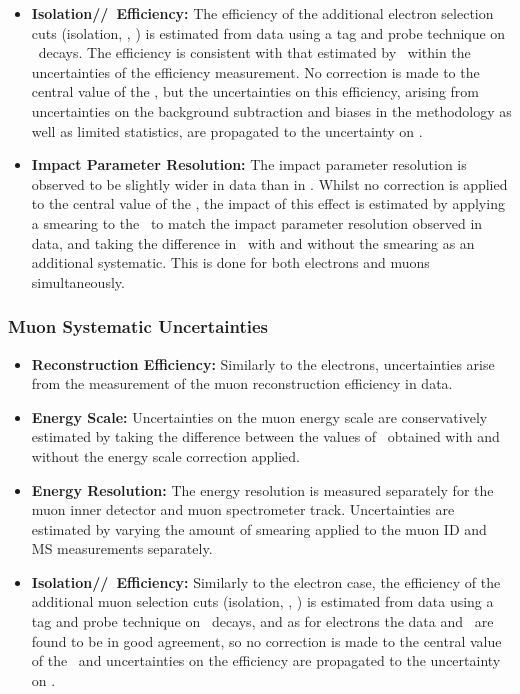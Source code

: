 \begin{itemize}
    \item {\bf  Isolation/\zzero/\dzero\ Efficiency:} The efficiency of the additional
    electron selection cuts (isolation, \zzero, \dzerosig) is estimated from
    data using a tag and probe technique on \Zee\ decays. The efficiency is
    consistent with that estimated by \mc\ within the uncertainties of the 
    efficiency measurement. No correction is made to the central value of the
    \mc, but the uncertainties on this efficiency, arising from uncertainties on
    the background subtraction and biases in the methodology as well as limited
    statistics, are propagated to the uncertainty on \CZZ.
     
    \item {\bf Impact Parameter Resolution:} The impact parameter
    resolution is observed to be slightly wider in data than in \mc. Whilst no
    correction is applied to the central value of the \mc, the impact of this
    effect is estimated by applying a smearing to the \mc\ to match the impact
    parameter resolution observed in data, and taking the difference in \CZZ\
    with and without the smearing as an additional systematic. This is done for
    both electrons and muons simultaneously.

\end{itemize}

\subsubsection{Muon Systematic Uncertainties}

\begin{itemize}
     \item {\bf Reconstruction Efficiency:}
     Similarly to the electrons, uncertainties arise from the measurement of the
     muon reconstruction efficiency in data.

    \item {\bf Energy Scale:} Uncertainties on the muon energy scale are
    conservatively estimated by taking the difference between the values of \CZZ\
    obtained with and without the energy scale correction applied.

    \item {\bf Energy Resolution:} The energy resolution is measured separately
    for the muon inner detector and muon spectrometer track. Uncertainties are
    estimated by varying the amount of smearing applied to the muon ID and MS
    measurements separately. 
    
    \item {\bf Isolation/\zzero/\dzero\ Efficiency:} Similarly to the electron case,
    the efficiency of the additional muon selection cuts (isolation, \zzero,
    \dzerosig) is estimated from data using a tag and probe technique on \Zmm\
    decays, and as for electrons the data and \mc\ are found to be in good
    agreement, so no correction is made to the central value of the \mc\ and
    uncertainties on the efficiency are propagated to the uncertainty on \CZZ.
\end{itemize}

